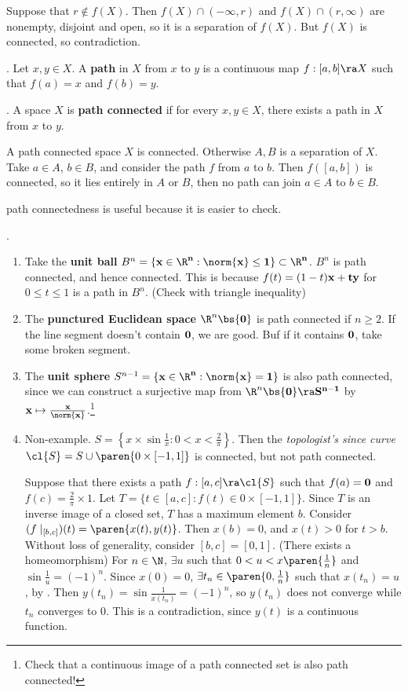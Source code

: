 \pf Suppose that \(r \notin f(X)\). Then \(f(X) \cap (-\infty, r)\) and \(f(X) \cap (r, \infty)\) are nonempty, disjoint and open, so it is a separation of \(f(X)\). But \(f(X)\) is connected, so contradiction.

.  Let \(x, y \in X\). A \textbf{path} in \(X\) from \(x\) to \(y\) is a continuous map \(f : [a, b] \ra X\) such that \(f(a) = x\) and \(f(b) = y\).

.  A space \(X\) is \textbf{path connected} if for every \(x, y \in X\), there exists a path in \(X\) from \(x\) to \(y\).

\rmk A path connected space \(X\) is connected. Otherwise \(A, B\) is a separation of \(X\). Take \(a \in A\), \(b \in B\), and consider the path \(f\) from \(a\) to \(b\). Then \(f([a, b])\) is connected, so it lies entirely in \(A\) or \(B\), then no path can join \(a \in A\) to \(b \in B\).

path connectedness is useful because it is easier to check.

\ex.
\begin{enumerate}
    \item Take the \textbf{unit ball} \(B^n = \{\bf{x} \in \R^n : \norm{\bf{x}} \leq 1\} \subset \R^n\). \(B^n\) is path connected, and hence connected. This is because \(f(t) = (1-t)\bf{x} + t\bf{y}\) for \(0\leq t \leq 1\) is a path in \(B^n\). (Check with triangle inequality)
    \item The \textbf{punctured Euclidean space} \(\R^n \bs \{\bf{0}\}\) is path connected if \(n \geq 2\). If the line segment doesn't contain \(\bf{0}\), we are good. Buf if it contains \(\bf{0}\), take some broken segment.
    \item The \textbf{unit sphere} \(S^{n-1} = \{\bf{x} \in \R^n : \norm{\bf{x}} = 1\}\) is also path connected, since we can construct a surjective map from \(\R^n \bs \{\bf{0}\} \ra S^{n-1}\) by \(\bf{x} \mapsto \frac{\bf{x}}{\norm{\bf{x}}}\).\footnote{Check that a continuous image of a path connected set is also path connected!}
    \item Non-example. \(S = \left\{x \times \sin \frac{1}{x} : 0 < x < \frac{2}{\pi}\right\}\).
          Then the \textit{topologist's since curve} \(\cl{S} = S \cup \paren{0 \times [-1, 1]}\) is connected, but not path connected.

          \pf Suppose that there exists a path \(f : [a, c] \ra \cl{S}\) such that \(f(a) = \bf{0}\) and \(f(c) = \frac{2}{\pi} \times 1\). Let \(T = \{t \in [a, c] : f(t) \in 0\times [-1, 1]\}\). Since \(T\) is an inverse image of a closed set, \(T\) has a maximum element \(b\). Consider \((f \mid_{[b, c]})(t) = \paren{x(t), y(t)}\). Then \(x(b) = 0\), and \(x(t) > 0\) for \(t > b\). Without loss of generality, consider \([b, c] = [0, 1]\). (There exists a homeomorphism) For \(n \in \N\), \(\exists u\) such that \(0 < u < x\paren{\frac{1}{n}}\) and \(\sin \frac{1}{u} = (-1)^n\). Since \(x(0) = 0\), \(\exists t_n \in \paren{0, \frac{1}{n}}\) such that \(x(t_n) = u\), by . Then \(y(t_n) = \sin \frac{1}{x(t_n)} = (-1)^n\), so \(y(t_n)\) does not converge while \(t_n\) converges to \(0\). This is a contradiction, since \(y(t)\) is a continuous function.
\end{enumerate}


